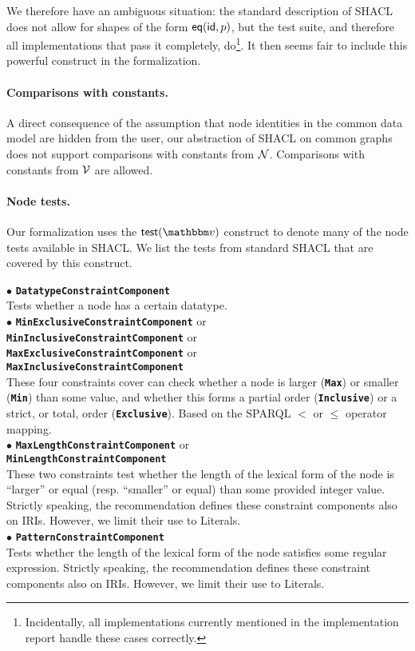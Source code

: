 We therefore have an ambiguous situation: the standard description of SHACL does not allow for shapes of the form $\mathsf{eq}(\mathsf{id},p)$, but the test suite, and therefore all implementations that pass it completely, do\footnote{Incidentally, all implementations currently mentioned in the implementation report handle these cases correctly.}. It then seems fair to include this powerful construct in the formalization. 

\paragraph{Comparisons with constants.}
A direct consequence of the assumption that node identities in the common data model are hidden from the user, our abstraction of SHACL on common graphs does not support comparisons with constants from $\mathcal{N}$. Comparisons with constants from $\mathcal{V}$ are allowed.

\paragraph{Node tests.} 

Our formalization uses the $\test(\vtype)$ construct to denote many of the node tests available in SHACL. We list the tests from standard SHACL that are covered by this construct.

\smallskip
\noindent
$\bullet$
{\bf \texttt{DatatypeConstraintComponent}}  \\ Tests whether a node has a certain datatype. \\
\noindent
$\bullet$ {\bf\texttt{MinExclusiveConstraintComponent}} or \\ \noindent \phantom{$\bullet$} {\bf\texttt{MinInclusiveConstraintComponent}} or \\ \noindent \phantom{$\bullet$} {\bf\texttt{MaxExclusiveConstraintComponent} }or \\ \noindent \phantom{$\bullet$} {\bf\texttt{MaxInclusiveConstraintComponent}} \\
These four constraints cover can check whether a node is larger (\texttt{\textbf{Max}}) or smaller (\texttt{\textbf{Min}}) than some value, and whether this forms a partial order (\texttt{\textbf{Inclusive}}) or a strict, or total, order (\texttt{\textbf{Exclusive}}).
Based on the SPARQL $<$ or $\leq$ operator mapping. \\
\noindent
$\bullet$ {\bf\texttt{MaxLengthConstraintComponent}} or \\ \noindent \phantom{$\bullet$}   {\bf\texttt{MinLengthConstraintComponent} } \\
  These two constraints test whether the
  length of the lexical form of the node is ``larger'' or equal (resp. ``smaller'' or equal) than
  some provided integer value. Strictly speaking, the recommendation defines these constraint components also on IRIs. However, we limit their use to Literals. \\
\noindent
$\bullet$ {\bf\texttt{PatternConstraintComponent}} \\ Tests whether the length of the lexical form of the node satisfies some regular expression. Strictly speaking, the recommendation defines these constraint components also on IRIs. However, we limit their use to Literals.

